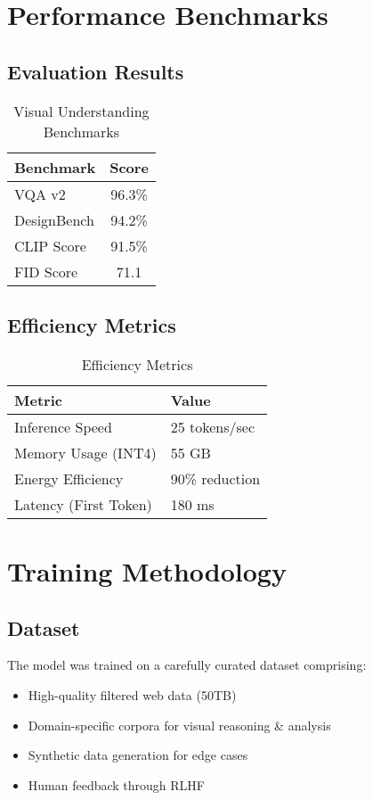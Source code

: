 \documentclass[11pt,a4paper]{article}
\begin{document}
\section{Performance Benchmarks}

\subsection{Evaluation Results}


\begin{table}[H]
\centering
\begin{tabular}{lc}
\toprule
\textbf{Benchmark} & \textbf{Score} \\
\midrule
VQA v2 & 96.3\% \\
DesignBench & 94.2\% \\
CLIP Score & 91.5\% \\
FID Score & 71.1 \\
\bottomrule
\end{tabular}
\caption{Visual Understanding Benchmarks}
\end{table}

\subsection{Efficiency Metrics}

\begin{table}[H]
\centering
\begin{tabular}{ll}
\toprule
\textbf{Metric} & \textbf{Value} \\
\midrule
Inference Speed & 25 tokens/sec \\
Memory Usage (INT4) & 55 GB \\
Energy Efficiency & 90\% reduction \\
Latency (First Token) & 180 ms \\
\bottomrule
\end{tabular}
\caption{Efficiency Metrics}
\end{table}

\section{Training Methodology}

\subsection{Dataset}
The model was trained on a carefully curated dataset comprising:
\begin{itemize}
    \item High-quality filtered web data (50TB)
    \item Domain-specific corpora for visual reasoning & analysis
    \item Synthetic data generation for edge cases
    \item Human feedback through RLHF
\end{itemize}
\end{document}
